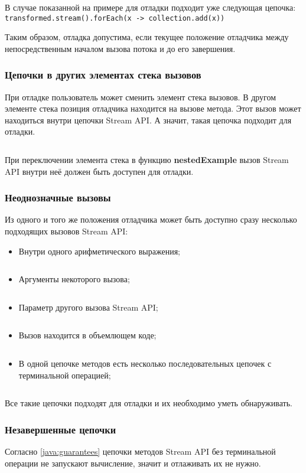 В случае показанной на примере для отладки подходит уже следующая цепочка: \texttt{transformed.stream().forEach(x -> collection.add(x))}

Таким образом, отладка допустима, если текущее положение отладчика между непосредственным началом вызова потока и до его завершения.

\subsubsection{Цепочки в других элементах стека вызовов}
При отладке пользователь может сменить элемент стека вызовов. В другом элементе стека позиция отладчика находится на вызове метода. Этот вызов может находиться внутри цепочки Stream API. А значит, такая цепочка подходит для отладки.
\inputminted{java}{chapter2/code/NestedMethod.java}

При переключении элемента стека в функцию \textbf{nestedExample} вызов Stream API внутри неё должен быть доступен для отладки.

\subsubsection{Неоднозначные вызовы}
Из одного и того же положения отладчика может быть доступно сразу несколько подходящих вызовов Stream API:
\begin{itemize}
	\item Внутри одного арифметического выражения;
	\inputminted{java}{chapter2/code/AmbiguousPlus.java}
	\item Аргументы некоторого вызова;
	\inputminted{java}{chapter2/code/AmbiguousArgs.java}
	\item Параметр другого вызова Stream API;
	\inputminted{java}{chapter2/code/AmbiguousNested.java}
	\item Вызов находится в объемлющем коде;
	\inputminted{java}{chapter2/code/AmbiguousLambda.java}
	\item В одной цепочке методов есть несколько последовательных цепочек с терминальной операцией;
	\inputminted{java}{chapter2/code/AmbiguousLinkedChains.java}
\end{itemize}
Все такие цепочки подходят для отладки и их необходимо уметь обнаруживать.

\subsubsection{Незавершенные цепочки}\label{java:incomplete}
Согласно \ref{java:guarantees} цепочки методов Stream API без терминальной операции не запускают вычисление, значит и отлаживать их не нужно.

